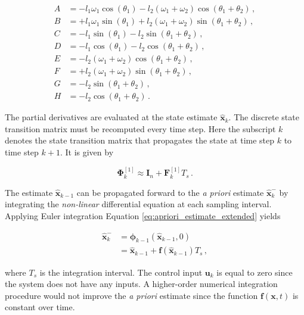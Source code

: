 \begin{equation*}
  \begin{split}
  	A &= -l_1 \omega_1 \cos(\theta_1) -l_2 (\omega_1 + \omega_2) \cos(\theta_1 + \theta_2)\,, \\
  	B &= +l_1 \omega_1 \sin(\theta_1) +l_2 (\omega_1 + \omega_2) \sin(\theta_1 + \theta_2)\,, \\
  	C &= -l_1 \sin(\theta_1) -l_2 \sin (\theta_1 + \theta_2)\,, \\
  	D &= -l_1 \cos(\theta_1) - l_2 \cos (\theta_1 + \theta_2)\,, \\
  	E &= -l_2 (\omega_1 + \omega_2) \cos(\theta_1+ \theta_2)\,, \\
  	F &= +l_2 (\omega_1 + \omega_2) \sin(\theta_1+ \theta_2)\,, \\
    G &= -l_2 \sin (\theta_1 + \theta_2)\,, \\
    H &= -l_2 \cos (\theta_1 + \theta_2)\,.
  \end{split}
\end{equation*}

\noindent
The partial derivatives are evaluated at the state estimate $\hat{\mathbf{x}}_{k}$. The discrete state transition matrix must be recomputed every time step. Here the subscript $k$ denotes the state transition matrix that propagates the state at time step $k$ to time step $k+1$. It is given by 

\begin{equation}
  \bm{\Phi}^{[1]}_{k} \approx \mathbf{I}_{n} + \mathbf{F}^{[1]}_k T_s\,.
\end{equation}

The estimate $\hat{\mathbf{x}}_{k-1}$ can be propagated forward to the \emph{a priori} estimate $\hat{\mathbf{x}}^{-}_k$ by integrating the \emph{non-linear} differential equation at each sampling interval. Applying Euler integration Equation \ref{eq:apriori_estimate_extended} yields

\begin{equation}\label{eq:apriori_estimate_extended_model}
\begin{split}
	\hat{\mathbf{x}}^{-}_k &= \bm{\phi}_{k-1}(\hat{\mathbf{x}}_{k-1}, 0) \\
	&= \hat{\mathbf{x}}_{k-1} + \mathbf{f}(\hat{\mathbf{x}}_{k-1})T_s\,, 
\end{split} 
\end{equation}

\noindent
where $T_s$ is the integration interval. The control input $\mathbf{u}_k$ is equal to zero since the system does not have any inputs. A higher-order numerical integration procedure would not improve the \emph{a priori} estimate since the function $\mathbf{f}(\mathbf{x}, t)$ is constant over time.

